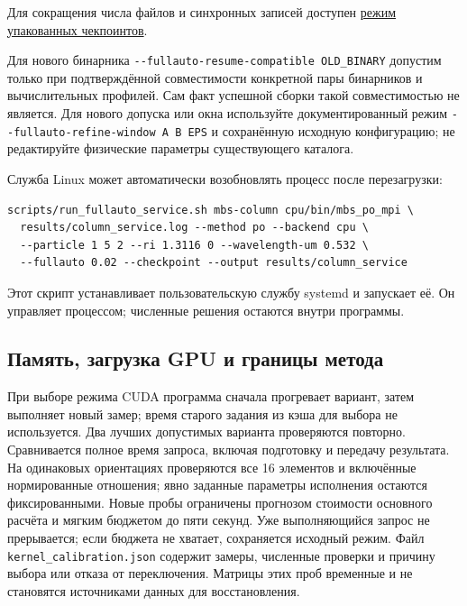 Для сокращения числа файлов и синхронных записей доступен
\href{FULLAUTO_PACKED_CHECKPOINTS_RU.md}{режим упакованных чекпоинтов}.

Для нового бинарника
\texttt{-\/-fullauto-resume-compatible\ OLD\_BINARY} допустим только при
подтверждённой совместимости конкретной пары бинарников и вычислительных
профилей. Сам факт успешной сборки такой совместимостью не является. Для
нового допуска или окна используйте документированный режим
\texttt{-\/-fullauto-refine-window\ A\ B\ EPS} и сохранённую исходную
конфигурацию; не редактируйте физические параметры существующего
каталога.

Служба Linux может автоматически возобновлять процесс после
перезагрузки:

\noindent\begin{minipage}{\linewidth}
\begin{verbatim}
scripts/run_fullauto_service.sh mbs-column cpu/bin/mbs_po_mpi \
  results/column_service.log --method po --backend cpu \
  --particle 1 5 2 --ri 1.3116 0 --wavelength-um 0.532 \
  --fullauto 0.02 --checkpoint --output results/column_service
\end{verbatim}
\end{minipage}

Этот скрипт устанавливает пользовательскую службу systemd и запускает
её. Он управляет процессом; численные решения остаются внутри программы.

\subsection{Память, загрузка GPU и границы
метода}\label{ux43fux430ux43cux44fux442ux44c-ux437ux430ux433ux440ux443ux437ux43aux430-gpu-ux438-ux433ux440ux430ux43dux438ux446ux44b-ux43cux435ux442ux43eux434ux430}

При выборе режима CUDA программа сначала прогревает вариант, затем
выполняет новый замер; время старого задания из кэша для выбора не
используется. Два лучших допустимых варианта проверяются повторно.
Сравнивается полное время запроса, включая подготовку и передачу
результата. На одинаковых ориентациях проверяются все 16 элементов и
включённые нормированные отношения; явно заданные параметры исполнения
остаются фиксированными. Новые пробы ограничены прогнозом стоимости
основного расчёта и мягким бюджетом до пяти секунд. Уже выполняющийся
запрос не прерывается; если бюджета не хватает, сохраняется исходный
режим. Файл \nolinkurl{kernel_calibration.json} содержит замеры, численные
проверки и причину выбора или отказа от переключения. Матрицы этих проб
временные и не становятся источниками данных для восстановления.

